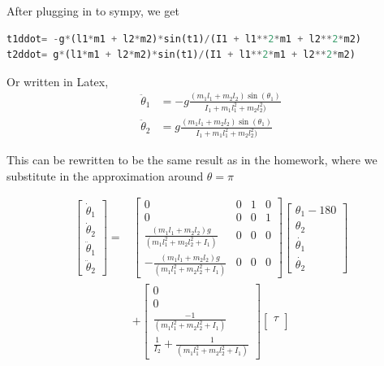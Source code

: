 \documentclass[conference]{IEEEtran}
\begin{document}
After plugging in to sympy, we get 

\begin{lstlisting}[language=Python, frame=single]
t1ddot= -g*(l1*m1 + l2*m2)*sin(t1)/(I1 + l1**2*m1 + l2**2*m2)
t2ddot= g*(l1*m1 + l2*m2)*sin(t1)/(I1 + l1**2*m1 + l2**2*m2)
\end{lstlisting}

Or written in Latex,
\begin{align}
    \ddot \theta_1 &= -g \frac{(m_1 l_1 + m_2 l_2) \sin(\theta_1) } 
    {I_1 + m_1 l_1^2 + m_2 l_2^2)} \\
    \ddot \theta_2 &= g \frac{(m_1 l_1 + m_2 l_2) \sin(\theta_1) } 
    {I_1 + m_1 l_1^2 + m_2 l_2^2)}
\end{align}


This can be rewritten to be the same result as in the homework, where we
substitute in the approximation around $\theta = \pi$

\begin{align}
    \begin{bmatrix}
        \dot\theta_1 \\
        \dot\theta_2 \\
        \ddot\theta_1 \\
        \ddot\theta_2
    \end{bmatrix}
    =&
    \begin{bmatrix}
        0 & 0 & 1 & 0 \\
        0 & 0 & 0 & 1 \\
        \frac{(m_1 l_1 + m_2 l_2) g}{(m_1 l_1^2 + m_2 l_2^2 + I_1)} & 0 & 0 & 0 \\
        - \frac{(m_1 l_1 + m_2 l_2) g}{(m_1 l_1^2 + m_2 l_2^2 + I_1)}  & 0 & 0 & 0
    \end{bmatrix}
    \begin{bmatrix}
        \theta_1 - 180 \\
        \theta_2 \\
        \dot{\theta_1} \\
        \dot{\theta_2}
    \end{bmatrix} \nonumber \\
    &+
    \begin{bmatrix}
        0 \\
        0 \\
        \frac{-1}{(m_1 l_1^2 + m_2 l_2^2 + I_1)} \\
        \frac{1}{I_2} + \frac{1}{(m_1 l_1^2 + m_2 l_2^2 + I_1)}
    \end{bmatrix}
    \begin{bmatrix}
        \tau \\
    \end{bmatrix}
\end{align}
\end{document}
